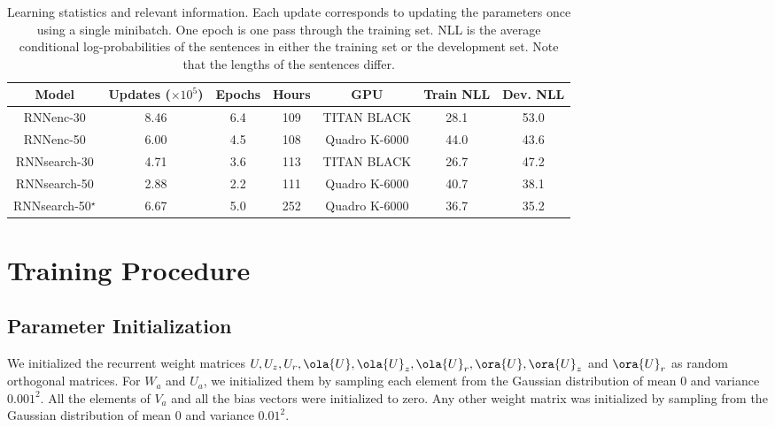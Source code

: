 \begin{table}[t]
    \centering                                                                                         
    \begin{tabular}{c|cccccc}                                                                           
        Model & Updates {\scriptsize ($\times 10^5$)} & Epochs 
        & Hours & GPU & Train NLL & Dev. NLL \\
        \hline                                                           
        \hline
        RNNenc-30 & 8.46 & 6.4 & 109 & {\small TITAN BLACK} & 28.1 & 53.0 \\                                                
        RNNenc-50 & 6.00 & 4.5 & 108 & {\small Quadro K-6000} & 44.0 & 43.6 \\
        \hline
        RNNsearch-30 & 4.71 & 3.6 & 113 & {\small TITAN BLACK} & 26.7 & 47.2 \\
        RNNsearch-50 & 2.88 & 2.2 & 111 & {\small Quadro K-6000} & 40.7 & 38.1 \\
        \hline
    RNNsearch-50$^\star$ & 6.67 & 5.0 & 252 & {\small Quadro K-6000} & 36.7 & 35.2 \\
    \end{tabular}                                                                                      
    \caption{Learning statistics and relevant information. Each update
        corresponds to updating the parameters once using a single minibatch. 
        One epoch is one pass through the training set.
        NLL is the average conditional log-probabilities of the
        sentences in either the training set or the development set. Note that
    the lengths of the sentences differ.}
    \label{tbl:stat}                                                                                   
\end{table}                                                                                            


\section{Training Procedure}
\label{sec:training_detail}

\subsection{Parameter Initialization}

We initialized the recurrent weight matrices $U, U_z, U_r, \ola{U}, \ola{U}_z,
\ola{U}_r, \ora{U}, \ora{U}_z$ and $\ora{U}_r$ as random orthogonal matrices.
For $W_a$ and $U_a$, we initialized them by sampling each element from the
Gaussian distribution of mean $0$ and variance $0.001^2$. All the elements of
$V_a$ and all the bias vectors were initialized to zero. Any other weight matrix
was initialized by sampling from the Gaussian distribution of mean $0$ and
variance $0.01^2$.

